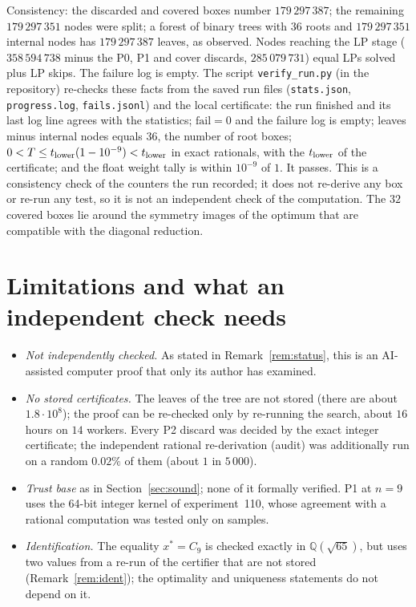 \documentclass[11pt]{amsart}
\theoremstyle{definition}
\newcommand{\Q}{\mathbb{Q}}
\begin{document}
Consistency: the discarded and covered boxes number $179\,297\,387$; the remaining $179\,297\,351$ nodes were split; a forest of binary trees with $36$ roots and $179\,297\,351$ internal nodes has $179\,297\,387$ leaves, as observed. Nodes reaching the LP stage ($358\,594\,738$ minus the P0, P1 and cover discards, $285\,079\,731$) equal LPs solved plus LP skips. The failure log is empty. The script \texttt{verify\_run.py} (in the repository) re-checks these facts from the saved run files (\texttt{stats.json}, \texttt{progress.log}, \texttt{fails.jsonl}) and the local certificate: the run finished and its last log line agrees with the statistics; $\mathrm{fail} = 0$ and the failure log is empty; leaves minus internal nodes equals $36$, the number of root boxes; $0 < T \le t_{\rm lower}(1-10^{-9}) < t_{\rm lower}$ in exact rationals, with the $t_{\rm lower}$ of the certificate; and the float weight tally is within $10^{-9}$ of $1$. It passes. This is a consistency check of the counters the run recorded; it does not re-derive any box or re-run any test, so it is not an independent check of the computation. The $32$ covered boxes lie around the symmetry images of the optimum that are compatible with the diagonal reduction. %

\section{Limitations and what an independent check needs}\label{sec:limits}

\begin{itemize}
\item \emph{Not independently checked.} As stated in Remark~\ref{rem:status}, this is an AI-assisted computer proof that only its author has examined. %
\item \emph{No stored certificates.} The leaves of the tree are not stored (there are about $1.8\cdot10^8$); the proof can be re-checked only by re-running the search, about $16$ hours on $14$ workers. Every P2 discard was decided by the exact integer certificate; the independent rational re-derivation (audit) was additionally run on a random $0.02\%$ of them (about $1$ in $5\,000$). %
\item \emph{Trust base} as in Section~\ref{sec:sound}; none of it formally verified. P1 at $n = 9$ uses the 64-bit integer kernel of experiment~110, whose agreement with a rational computation was tested only on samples.
\item \emph{Identification.} The equality $x^* = C_9$ is checked exactly in $\Q(\sqrt{65})$, but uses two values from a re-run of the certifier that are not stored (Remark~\ref{rem:ident}); the optimality and uniqueness statements do not depend on it.
\end{itemize}
\end{document}
